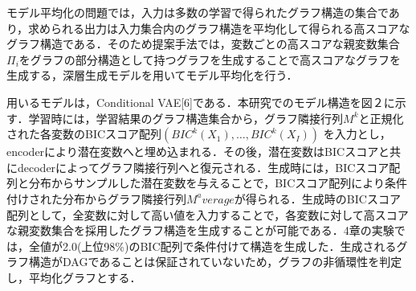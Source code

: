 モデル平均化の問題では，入力は多数の学習で得られたグラフ構造の集合であり，求められる出力は入力集合内のグラフ構造を平均化して得られる高スコアなグラフ構造である．そのため提案手法では，変数ごとの高スコアな親変数集合$Π_i$をグラフの部分構造として持つグラフを生成することで高スコアなグラフを生成する，深層生成モデルを用いてモデル平均化を行う．

用いるモデルは，Conditional VAE[6]である．本研究でのモデル構造を図２に示す．学習時には，学習結果のグラフ構造集合から，グラフ隣接行列$M^k$と正規化された各変数のBICスコア配列$(BIC^k (X_1 ),…,BIC^k (X_I ))$  を入力とし，encoderにより潜在変数へと埋め込まれる．その後，潜在変数はBICスコアと共にdecoderによってグラフ隣接行列へと復元される．生成時には，BICスコア配列と分布からサンプルした潜在変数を与えることで，BICスコア配列により条件付けされた分布からグラフ隣接行列$M^average$が得られる．生成時のBICスコア配列として，全変数に対して高い値を入力することで，各変数に対して高スコアな親変数集合を採用したグラフ構造を生成することが可能である．4章の実験では，全値が2.0(上位98\%)のBIC配列で条件付けて構造を生成した．生成されるグラフ構造がDAGであることは保証されていないため，グラフの非循環性を判定し，平均化グラフとする．